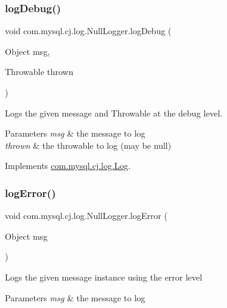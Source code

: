 \subsubsection{\texorpdfstring{log\+Debug()}{logDebug()}\hspace{0.1cm}{\footnotesize\ttfamily [2/2]}}
{\footnotesize\ttfamily void com.\+mysql.\+cj.\+log.\+Null\+Logger.\+log\+Debug (\begin{DoxyParamCaption}\item[{Object}]{msg,  }\item[{Throwable}]{thrown }\end{DoxyParamCaption})}

Logs the given message and Throwable at the \textquotesingle{}debug\textquotesingle{} level.


\begin{DoxyParams}{Parameters}
{\em msg} & the message to log \\
\hline
{\em thrown} & the throwable to log (may be null) \\
\hline
\end{DoxyParams}


Implements \mbox{\hyperlink{interfacecom_1_1mysql_1_1cj_1_1log_1_1_log_a42c9900bc643b771d7e337686ac4f799}{com.\+mysql.\+cj.\+log.\+Log}}.

\mbox{\label{classcom_1_1mysql_1_1cj_1_1log_1_1_null_logger_aa955e1f3a7fa6eaa275d60833b56ce79}} 
\subsubsection{\texorpdfstring{log\+Error()}{logError()}\hspace{0.1cm}{\footnotesize\ttfamily [1/2]}}
{\footnotesize\ttfamily void com.\+mysql.\+cj.\+log.\+Null\+Logger.\+log\+Error (\begin{DoxyParamCaption}\item[{Object}]{msg }\end{DoxyParamCaption})}

Logs the given message instance using the \textquotesingle{}error\textquotesingle{} level


\begin{DoxyParams}{Parameters}
{\em msg} & the message to log \\
\hline
\end{DoxyParams}


